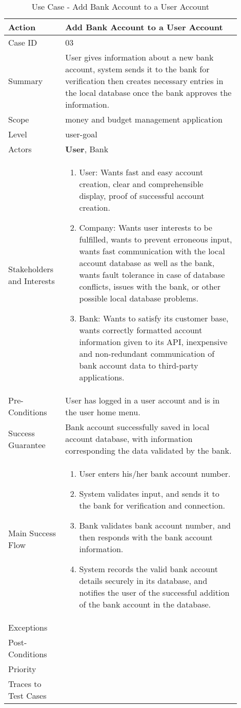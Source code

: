 \documentclass[11pt]{article}
\newcounter{use case ID}
\newcommand\tabularhead[1]{
\begin{table}[ht]
    \addtocounter{use case ID}{1}
    \caption{Use Case \arabic{use case ID} - #1}
    \vspace{0.2cm}
    \begin{tabular}{|p{0.2\linewidth}|p{0.70\linewidth}|}
    \hline
        \textbf{Action} & \textbf{#1} \\
        \hline}
\newcommand\addrow[2]{#1 & #2\\ \hline}
\newcommand\addmulrow[2]{ \begin{minipage}[t][][t]{2.5cm}#1\end{minipage}
        &\begin{minipage}[t][][t]{11cm}
        \begin{enumerate}[itemsep=-1ex] #2   \end{enumerate}
    \end{minipage}\vfill\\ \hline}
\newenvironment{usecase}{\tabularhead}
{\hline\end{tabular}\end{table}}
\begin{document}
\begin{usecase}{Add Bank Account to a User Account}
    \addrow{Case ID}{03}
    \addrow{Summary}{User gives information about a new bank account, system sends it to the bank for verification then creates necessary entries in the local database once the bank approves the information.}
    \addrow{Scope}{money and budget management application}
    \addrow{Level}{user-goal}
    \addrow{Actors}{\textbf{User}, Bank}
    \addmulrow{Stakeholders and Interests}{
        \item User: Wants fast and easy account creation, clear and comprehensible display, proof of successful account creation.
        \item Company: Wants user interests to be fulfilled, wants to prevent erroneous input, wants fast communication with the local account database as well as the bank, wants fault tolerance in case of database conflicts, issues with the bank, or other possible local database problems.
        \item Bank: Wants to satisfy its customer base, wants correctly formatted account information given to its API, inexpensive and non-redundant communication of bank account data to third-party applications.}
    \addrow{Pre-Conditions}{User has logged in a user account and is in the user home menu.}
    \addrow{Success Guarantee}{Bank account successfully saved in local account database, with information corresponding the data validated by the bank.}
    \addmulrow{Main Success Flow}{
        \item User enters his/her bank account number.
        \item System validates input, and sends it to the bank for verification and connection.
        \item Bank validates bank account number, and then responds with the bank account information.
        \item System records the valid bank account details securely in its database, and notifies the user of the successful addition of the bank account in the database.}
    \addrow{Exceptions}{}
    \addrow{Post-Conditions}{}
    \addrow{Priority}{}
    \addrow{Traces to Test Cases}{}
\end{usecase}
\end{document}
